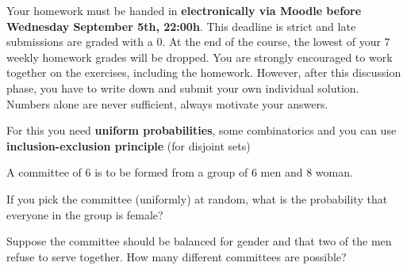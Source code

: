 \documentclass[a4paper,10pt,landscape,twocolumn]{scrartcl}
\newcommand\deadline{Wednesday September 5th, 22:00h}
\begin{document}
\homeworkproblems

{\sffamily\noindent
Your homework must be handed in \textbf{electronically via Moodle before \deadline}. This deadline is strict and late submissions are graded with a 0. At the end of the course, the lowest of your 7 weekly homework grades will be dropped. You are strongly encouraged to work together on the exercises, including the homework. However, after this discussion phase, you have to write down and submit your own individual solution. Numbers alone are never sufficient, always motivate your answers.
}

	
\begin{exercise}[Committees (3pt)]
	\begin{mycomment}
		For this you need \textbf{uniform probabilities}, some combinatorics and you can use \textbf{inclusion-exclusion principle} (for disjoint sets)
	\end{mycomment}

	A committee of 6 is to be formed from a group of 6 men and 8 woman.

	\begin{subex}[1pt]
	If you pick the committee (uniformly) at random, what is the probability that everyone in the group is female?
	\end{subex}

	\begin{subex}[2pt]
		Suppose the committee should be balanced for gender and that two of the men refuse to serve together. How many different committees are possible?
	\end{subex}
\end{exercise}
\end{document}
